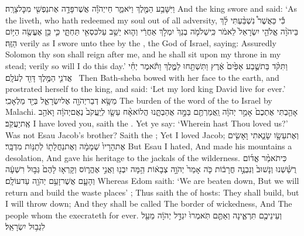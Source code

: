 {וַיִּשָּׁבַ֥ע הַמֶּ֖לֶךְ וַיֹּאמַ֑ר חַי\maqqaf יְהֹוָ֕ה אֲשֶׁר\maqqaf פָּדָ֥ה אֶת\maqqaf נַפְשִׁ֖י מִכׇּל\maqqaf צָרָֽה׃}
{And the king swore and said: ‘As the \lord\space liveth, who hath redeemed my soul out of all adversity,}
{כִּ֡י כַּאֲשֶׁר֩ נִשְׁבַּ֨עְתִּי לָ֜ךְ בַּיהֹוָ֨ה אֱלֹהֵ֤י יִשְׂרָאֵל֙ לֵאמֹ֔ר כִּֽי\maqqaf שְׁלֹמֹ֤ה בְנֵךְ֙ יִמְלֹ֣ךְ אַחֲרַ֔י וְה֛וּא יֵשֵׁ֥ב עַל\maqqaf כִּסְאִ֖י תַּחְתָּ֑י כִּ֛י כֵּ֥ן אֶעֱשֶׂ֖ה הַיּ֥וֹם הַזֶּֽה׃}
{verily as I swore unto thee by the \lord, the God of Israel, saying: Assuredly Solomon thy son shall reign after me, and he shall sit upon my throne in my stead; verily so will I do this day.’}
{וַתִּקֹּ֨ד בַּת\maqqaf שֶׁ֤בַע אַפַּ֙יִם֙ אֶ֔רֶץ וַתִּשְׁתַּ֖חוּ לַמֶּ֑לֶךְ וַתֹּ֕אמֶר יְחִ֗י אֲדֹנִ֛י הַמֶּ֥לֶךְ דָּוִ֖ד לְעֹלָֽם׃ \petucha }
{Then Bath-sheba bowed with her face to the earth, and prostrated herself to the king, and said: ‘Let my lord king David live for ever.’}
\label{haft_6}
\setcounter{chap}{1}
\setcounter{verse}{1}
{מַשָּׂ֥א דְבַר\maqqaf יְהֹוָ֖ה אֶל\maqqaf יִשְׂרָאֵ֑ל בְּיַ֖ד מַלְאָכִֽי׃}
{The burden of the word of the \lord\space to Israel by Malachi.}
{אָהַ֤בְתִּי אֶתְכֶם֙ אָמַ֣ר יְהֹוָ֔ה וַֽאֲמַרְתֶּ֖ם בַּמָּ֣ה אֲהַבְתָּ֑נוּ הֲלוֹא\maqqaf אָ֨ח עֵשָׂ֤ו לְיַֽעֲקֹב֙ נְאֻם\maqqaf יְהֹוָ֔ה וָאֹהַ֖ב אֶֽת\maqqaf יַעֲקֹֽב׃}
{I have loved you, saith the \lord. Yet ye say: ‘Wherein hast Thou loved us?’ Was not Esau Jacob’s brother? Saith the \lord; Yet I loved Jacob;}
{וְאֶת\maqqaf עֵשָׂ֖ו שָׂנֵ֑אתִי וָאָשִׂ֤ים אֶת\maqqaf הָרָיו֙ שְׁמָמָ֔ה וְאֶת\maqqaf נַחֲלָת֖וֹ לְתַנּ֥וֹת מִדְבָּֽר׃}
{But Esau I hated, And made his mountains a desolation, And gave his heritage to the jackals of the wilderness.}
{כִּי\maqqaf תֹאמַ֨ר אֱד֜וֹם רֻשַּׁ֗שְׁנוּ וְנָשׁוּב֙ וְנִבְנֶ֣ה חֳרָב֔וֹת כֹּ֤ה אָמַר֙ יְהֹוָ֣ה צְבָא֔וֹת הֵ֥מָּה יִבְנ֖וּ וַאֲנִ֣י אֶהֱר֑וֹס וְקָרְא֤וּ לָהֶם֙ גְּב֣וּל רִשְׁעָ֔ה וְהָעָ֛ם אֲשֶׁר\maqqaf זָעַ֥ם יְהֹוָ֖ה עַד\maqqaf עוֹלָֽם׃}
{Whereas Edom saith: ‘We are beaten down, But we will return and build the waste places’ ; Thus saith the \lord\space of hosts: They shall build, but I will throw down; And they shall be called The border of wickedness, And The people whom the \lord\space execrateth for ever.}
{וְעֵינֵיכֶ֖ם תִּרְאֶ֑ינָה וְאַתֶּ֤ם תֹּֽאמְרוּ֙ יִגְדַּ֣ל יְהֹוָ֔ה מֵעַ֖ל לִגְב֥וּל יִשְׂרָאֵֽל׃}
